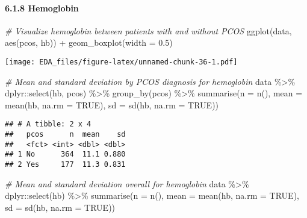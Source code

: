 \documentclass[
]{article}
\newenvironment{Shaded}{\begin{snugshade}}{\end{snugshade}}
\newcommand{\AttributeTok}[1]{\textcolor[rgb]{0.77,0.63,0.00}{#1}}
\newcommand{\CommentTok}[1]{\textcolor[rgb]{0.56,0.35,0.01}{\textit{#1}}}
\newcommand{\ConstantTok}[1]{\textcolor[rgb]{0.00,0.00,0.00}{#1}}
\newcommand{\FloatTok}[1]{\textcolor[rgb]{0.00,0.00,0.81}{#1}}
\newcommand{\FunctionTok}[1]{\textcolor[rgb]{0.00,0.00,0.00}{#1}}
\newcommand{\NormalTok}[1]{#1}
\newcommand{\SpecialCharTok}[1]{\textcolor[rgb]{0.00,0.00,0.00}{#1}}
\begin{document}
\hypertarget{hemoglobin}{%
\paragraph{6.1.8 Hemoglobin}\label{hemoglobin}}

\begin{Shaded}
\begin{Highlighting}[]
\CommentTok{\# Visualize hemoglobin between patients with and without PCOS}
\FunctionTok{ggplot}\NormalTok{(data, }\FunctionTok{aes}\NormalTok{(pcos, hb)) }\SpecialCharTok{+} \FunctionTok{geom\_boxplot}\NormalTok{(}\AttributeTok{width =} \FloatTok{0.5}\NormalTok{)}
\end{Highlighting}
\end{Shaded}

\texttt{[image: EDA\_files/figure-latex/unnamed-chunk-36-1.pdf]}

\begin{Shaded}
\begin{Highlighting}[]
\CommentTok{\# Mean and standard deviation by PCOS diagnosis for hemoglobin}
\NormalTok{data }\SpecialCharTok{\%\textgreater{}\%}\NormalTok{ dplyr}\SpecialCharTok{::}\FunctionTok{select}\NormalTok{(hb, pcos) }\SpecialCharTok{\%\textgreater{}\%} \FunctionTok{group\_by}\NormalTok{(pcos) }\SpecialCharTok{\%\textgreater{}\%} 
  \FunctionTok{summarise}\NormalTok{(}\AttributeTok{n =} \FunctionTok{n}\NormalTok{(), }
            \AttributeTok{mean =} \FunctionTok{mean}\NormalTok{(hb, }\AttributeTok{na.rm =} \ConstantTok{TRUE}\NormalTok{), }
            \AttributeTok{sd =} \FunctionTok{sd}\NormalTok{(hb, }\AttributeTok{na.rm =} \ConstantTok{TRUE}\NormalTok{))}
\end{Highlighting}
\end{Shaded}

\begin{verbatim}
## # A tibble: 2 x 4
##   pcos      n  mean    sd
##   <fct> <int> <dbl> <dbl>
## 1 No      364  11.1 0.880
## 2 Yes     177  11.3 0.831
\end{verbatim}

\begin{Shaded}
\begin{Highlighting}[]
\CommentTok{\# Mean and standard deviation overall for hemoglobin}
\NormalTok{data }\SpecialCharTok{\%\textgreater{}\%}\NormalTok{ dplyr}\SpecialCharTok{::}\FunctionTok{select}\NormalTok{(hb) }\SpecialCharTok{\%\textgreater{}\%} 
  \FunctionTok{summarise}\NormalTok{(}\AttributeTok{n =} \FunctionTok{n}\NormalTok{(), }
            \AttributeTok{mean =} \FunctionTok{mean}\NormalTok{(hb, }\AttributeTok{na.rm =} \ConstantTok{TRUE}\NormalTok{), }
            \AttributeTok{sd =} \FunctionTok{sd}\NormalTok{(hb, }\AttributeTok{na.rm =} \ConstantTok{TRUE}\NormalTok{))}
\end{Highlighting}
\end{Shaded}
\end{document}
